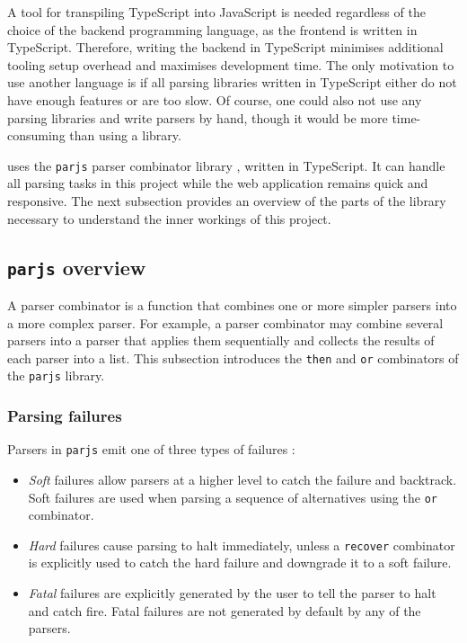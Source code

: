 A tool for transpiling TypeScript into JavaScript is needed regardless of the choice of the backend programming language, as the frontend is written in TypeScript. Therefore, writing the backend in TypeScript minimises additional tooling setup overhead and maximises development time. The only motivation to use another language is if all parsing libraries written in TypeScript either do not have enough features or are too slow. Of course, one could also not use any parsing libraries and write parsers by hand, though it would be more time-consuming than using a library.

\projectname{} uses the \lstinline{parjs} parser combinator library \cite{parjs}, written in TypeScript. It can handle all parsing tasks in this project while the web application remains quick and responsive. The next subsection provides an overview of the parts of the library necessary to understand the inner workings of this project.

\subsection{\texorpdfstring{\lstinline{parjs}}{parjs} overview}
A parser combinator is a function that combines one or more simpler parsers into a more complex parser. For example, a parser combinator may combine several parsers into a parser that applies them sequentially and collects the results of each parser into a list. This subsection introduces the \lstinline{then} and \lstinline{or} combinators of the \lstinline{parjs} library.

\subsubsection{Parsing failures}
Parsers in \lstinline{parjs} emit one of three types of failures \cite{parjs}:
\begin{itemize}
    \item \textit{Soft} failures allow parsers at a higher level to catch the failure and backtrack. Soft failures are used when parsing a sequence of alternatives using the \lstinline{or} combinator.
    \item \textit{Hard} failures cause parsing to halt immediately, unless a \lstinline{recover} combinator is explicitly used to catch the hard failure and downgrade it to a soft failure.
    \item \textit{Fatal} failures are explicitly generated by the user to tell the parser to halt and catch fire. Fatal failures are not generated by default by any of the parsers.
\end{itemize}

